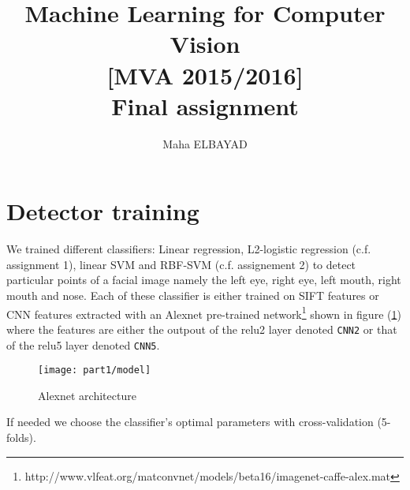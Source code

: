 \documentclass{acmsiggraph}
\title{Machine Learning for Computer Vision\\ {\large [MVA 2015/2016]}\\
\vspace{10pt}
Final assignment}
\author{Maha ELBAYAD
}
\newcommand{\1}{\mathbbm{1}}
\begin{document}
\maketitle
\section{Detector training}
	We trained different classifiers: Linear regression, L2-logistic regression (c.f. assignment 1), linear SVM and RBF-SVM (c.f. assignement 2) to detect particular points of a facial image namely the left eye, right eye, left mouth, right mouth and nose. Each of these classifier is either trained on SIFT features or CNN features extracted with an Alexnet pre-trained network\footnote{http://www.vlfeat.org/matconvnet/models/beta16/imagenet-caffe-alex.mat} shown in figure (\ref{model}) where the features are either the outpout of the relu2 layer denoted \texttt{CNN2} or that of the relu5 layer denoted \texttt{CNN5}. 
	\begin{figure}[H]
	\centering
	\texttt{[image: part1/model]}
	\caption{\label{model}Alexnet architecture}
	\end{figure}

	If needed we choose the classifier's optimal parameters with cross-validation (5-folds).
\end{document}
